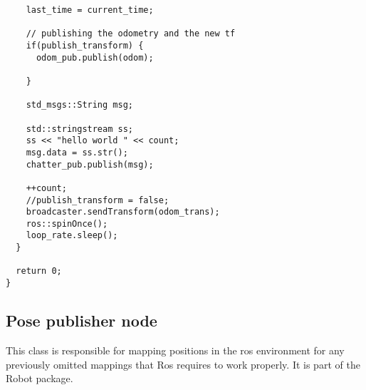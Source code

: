 \begin{lstlisting}
    last_time = current_time;

    // publishing the odometry and the new tf
    if(publish_transform) {
      odom_pub.publish(odom);
      
    }
    
    std_msgs::String msg;

    std::stringstream ss;
    ss << "hello world " << count;
    msg.data = ss.str();
    chatter_pub.publish(msg);

    ++count;
    //publish_transform = false;
    broadcaster.sendTransform(odom_trans);
    ros::spinOnce();
    loop_rate.sleep();
  }

  return 0;
}
\end{lstlisting}
\subsection{Pose publisher node}
This class is responsible for mapping positions in the ros environment for any previously omitted mappings that Ros requires to work properly. It is part of the Robot package.
